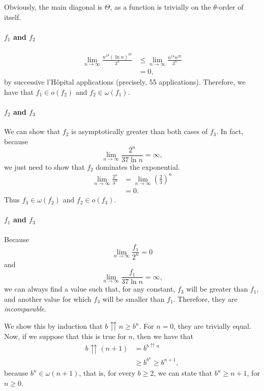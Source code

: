  

Obviously, the main diagonal is $\Theta$, as a function is trivially on the $\theta$-order of itself.

\paragraph{$f_1$ and $f_2$}

\begin{align*}
    \lim_{n \to \infty} \frac{n^{18}\left( \ln n \right)^{37}}{3^{n}} &\le \lim_{n \to \infty} \frac{n^{18} n^{37}}{3^{n}} \\
    &= 0
,\end{align*}
by successive l'Hôpital applications (precisely, 55 applications).
Therefore, we have that $f_1 \in o(f_2)$ and $f_2 \in  \omega(f_1)$.

\paragraph{$f_2$ and $f_3$}

We can show that $f_2$ is asymptotically greater than both cases of $f_3$.
In fact, because \[
\lim_{n \to \infty} \frac{2^{n}}{37 \ln n} = \infty
,\] we just need to show that $f_2$ dominates the exponential.
\begin{align*}
    \lim_{n \to \infty} \frac{2^{n}}{3^{n}} &= \lim_{n \to \infty} \left( \frac{2}{3} \right)^{n}  \\
    &= 0
.\end{align*}
Thus $f_3 \in \omega(f_2)$ and $f_2 \in o(f_3)$.


\paragraph{$f_1$ and $f_3$}

Because \[
\lim_{n \to \infty} \frac{f_1}{2^{n}} = 0
\] and \[
\lim_{n \to \infty} \frac{f_1}{37 \ln n} = \infty
,\] we can always find a value such that, for any constant, $f_3$ will be greater than $f_1$, and another value for which $f_3$ will be smaller than $f_1$.
Therefore, they are \emph{incomparable}.



We show this by induction that $b\upuparrows n \ge b^{n}$.
For $n=0$, they are trivially equal.
Now, if we suppose that this is true for $n$, then we have that
\begin{align*}
    b\upuparrows (n+1) &= b^{b\upuparrows n} \\
    &\ge  b^{b^{n}} \ge b^{n+1}
,\end{align*}
because $b^{n} \in \omega(n+1)$, that is, for every $b\ge 2$, we can state that $b^{n} \ge n+1$, for $n\ge 0$.

